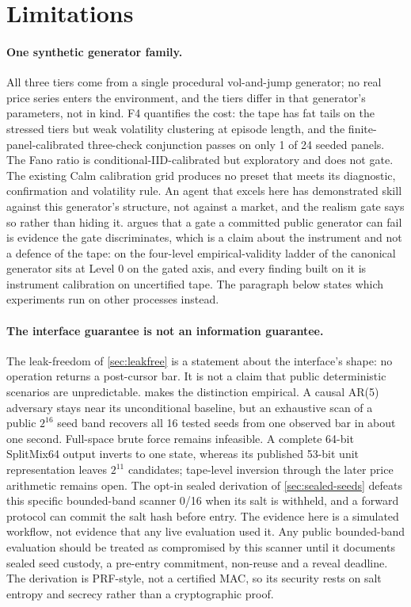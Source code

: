 \section{Limitations}\label{sec:limitations}

\paragraph{One synthetic generator family.} All three tiers come from a single procedural vol-and-jump generator; no real price series enters the environment, and the tiers differ in that generator's parameters, not in kind. F4 quantifies the cost: the tape has fat tails on the stressed tiers but weak volatility clustering at episode length, and the finite-panel-calibrated three-check conjunction passes on only 1 of 24 seeded panels. The Fano ratio is conditional-IID-calibrated but exploratory and does not gate. The existing Calm calibration grid produces no preset that meets its diagnostic, confirmation and volatility rule. An agent that excels here has demonstrated skill against this generator's structure, not against a market, and the realism gate says so rather than hiding it.  argues that a gate a committed public generator can fail is evidence the gate discriminates, which is a claim about the instrument and not a defence of the tape: on the four-level empirical-validity ladder of \citet{fagiolo2019validation} the canonical generator sits at Level 0 on the gated axis, and every finding built on it is instrument calibration on uncertified tape. The paragraph below states which experiments run on other processes instead.

\paragraph{The interface guarantee is not an information guarantee.} The leak-freedom of \cref{sec:leakfree} is a statement about the interface's shape: no operation returns a post-cursor bar. It is not a claim that public deterministic scenarios are unpredictable.  makes the distinction empirical. A causal AR(5) adversary stays near its unconditional baseline, but an exhaustive scan of a public $2^{16}$ seed band recovers all 16 tested seeds from one observed bar in about one second. Full-space brute force remains infeasible. A complete 64-bit SplitMix64 output inverts to one state, whereas its published 53-bit unit representation leaves $2^{11}$ candidates; tape-level inversion through the later price arithmetic remains open. The opt-in sealed derivation of \cref{sec:sealed-seeds} defeats this specific bounded-band scanner 0/16 when its salt is withheld, and a forward protocol can commit the salt hash before entry. The evidence here is a simulated workflow, not evidence that any live evaluation used it. Any public bounded-band evaluation should be treated as compromised by this scanner until it documents sealed seed custody, a pre-entry commitment, non-reuse and a reveal deadline. The derivation is PRF-style, not a certified MAC, so its security rests on salt entropy and secrecy rather than a cryptographic proof.

